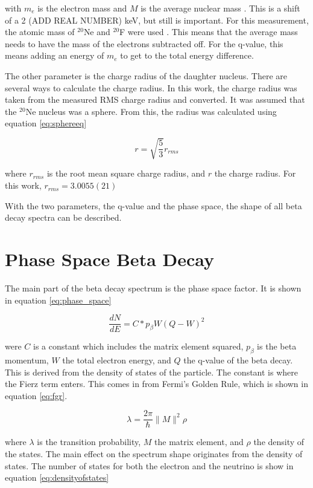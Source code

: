 \documentclass[../MaxHughesThesis.tex]{subfiles}
\begin{document}
with $m_{e}$ is the electron mass and $M$ is the average nuclear mass \cite{Hol74}.
This is a shift of a 2 (ADD REAL NUMBER) keV, but still is important.
For this measurement, the atomic mass of $^{20}$Ne and $^{20}$F were used \cite{Pfe12}.
This means that the average mass needs to have the mass of the electrons subtracted off. 
For the q-value, this means adding an energy of $m_{e}$ to get to the total energy difference.

The other parameter is the charge radius of the daughter nucleus.
There are several ways to calculate the charge radius.
In this work, the charge radius was taken from the measured RMS charge radius and converted.
It was assumed that the $^{20}$Ne nucleus was a sphere. 
From this, the radius was calculated using equation \ref{eq:sphereeq}

\begin{equation}
	r = \sqrt{\frac{5}{3}}r_{rms}	
	\label{eq:sphereeq}
\end{equation}

where $r_{rms}$ is the root mean square charge radius, and $r$ the charge radius.
For this work, $r_{rms} = 3.0055 (21)$ \cite{Ang13}

With the two parameters, the q-value and the phase space, the shape of all beta decay spectra can be described.

\section{Phase Space Beta Decay}
The main part of the beta decay spectrum is the phase space factor.
It is shown in equation \ref{eq:phase_space}

\begin{equation}
	\frac{dN}{dE} = C * p_{\beta}W(Q - W)^{2}
	\label{eq:phase_space}
\end{equation}

were $C$ is a constant which includes the matrix element squared, $p_{\beta}$ is the beta momentum, $W$ the total electron energy, and $Q$ the q-value of the beta decay.
This is derived from the density of states of the particle.
The constant is where the Fierz term enters. 
This comes in from Fermi's Golden Rule, which is shown in equation \ref{eq:fgr}.

\begin{equation}
	\lambda = \frac{2\pi}{\hbar}\|M\|^{2}\rho
	\label{eq:fgr}
\end{equation}

where $\lambda$ is the transition probability, $M$ the matrix element, and $\rho$ the density of the states.
The main effect on the spectrum shape originates from the density of states.
The number of states for both the electron and the neutrino is show in equation \ref{eq:densityofstates}
\end{document}
